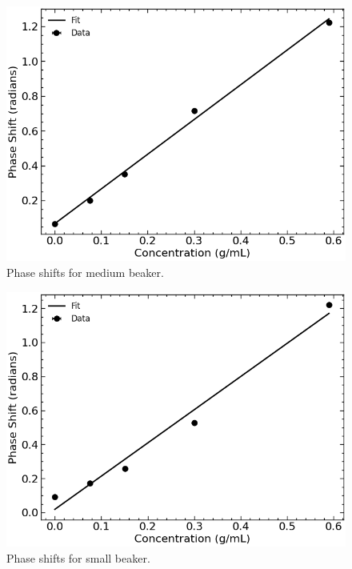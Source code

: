 \begin{figure}[H]
    \begin{center}
        \includegraphics[width=\columnwidth]{../figures/medium_beaker_phase_shifts.png}
    \end{center}
    \caption{Phase shifts for medium beaker.}
    \label{fig:medium_beaker_phase_shifts}
\end{figure}

\begin{figure}[H]
    \begin{center}
        \includegraphics[width=\columnwidth]{../figures/small_beaker_phase_shifts.png}
    \end{center}
    \caption{Phase shifts for small beaker.}
    \label{fig:small_beaker_phase_shifts}
\end{figure}

